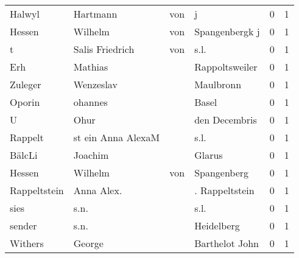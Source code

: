 \begin{center}
\begin{tiny}
\begin{longtabu}{llllrr}
                   Halwyl &                           Hartmann &         von &                                           j &          0 &         1 \\
                   Hessen &                            Wilhelm &         von &                              Spangenbergk j &          0 &         1 \\
                        t &                    Salis Friedrich &         von &                                        s.l. &          0 &         1 \\
                      Erh &                            Mathias &             &                              Rappoltsweiler &          0 &         1 \\
                  Zuleger &                          Wenzeslav &             &                                   Maulbronn &          0 &         1 \\
                   Oporin &                            ohannes &             &                                       Basel &          0 &         1 \\
                        U &                               Ohur &             &                               den Decembris &          0 &         1 \\
                  Rappelt &                 st ein Anna AlexaM &             &                                        s.l. &          0 &         1 \\
                   BälcLi &                            Joachim &             &                                      Glarus &          0 &         1 \\
                   Hessen &                            Wilhelm &         von &                                 Spangenberg &          0 &         1 \\
             Rappeltstein &                         Anna Alex. &             &                              . Rappeltstein &          0 &         1 \\
                     sies &                               s.n. &             &                                        s.l. &          0 &         1 \\
                   sender &                               s.n. &             &                                  Heidelberg &          0 &         1 \\
                  Withers &                             George &             &                              Barthelot John &          0 &         1 \\

\end{longtabu}
\end{tiny}
\end{center}
